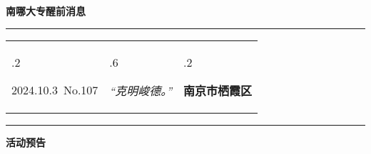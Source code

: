 \documentclass[letterpaper, 12pt]{article}
\begin{document}
\begin{center}
    \Huge\textbf{南哪大专醒前消息}
\end{center}
\vspace{4mm}
\hrule
\renewcommand\tabularxcolumn[1]{m{#1}}
\begin{tabularx}{\textwidth}{>{\hsize.2\hsize}X>{\hsize.6\hsize}X>{\hsize.2\hsize}X}
    \begin{flushleft}
        2024.10.3\, No.107
    \end{flushleft}
    &
    \begin{center}
        \textit{“克明峻德。”}
    \end{center}
    &
    \begin{flushright}
        \textbf{南京市栖霞区}
    \end{flushright}
\end{tabularx}
\vspace{-3.5mm}
\hrule
\vspace{4mm}
\centerline{\huge\textbf{活动预告}}
\end{document}
